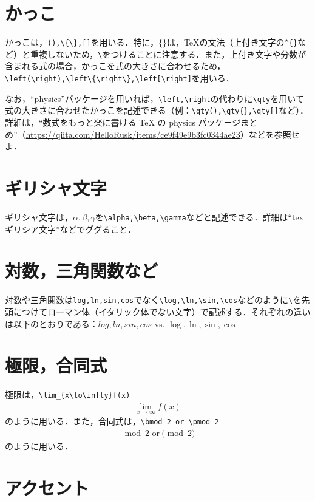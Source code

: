 \documentclass[11pt,a4paper]{jsarticle}
\begin{document}
\section{かっこ}

かっこは，\verb|(),\{\},[]|を用いる．特に，$\{\}$は，\TeX の文法（上付き文字の\verb|^{}|など）と重複しないため，\verb|\|をつけることに注意する．また，上付き文字や分数が含まれる式の場合，かっこを式の大きさに合わせるため，\verb|\left(\right),\left\{\right\},\left[\right]|を用いる．

なお，``physics''パッケージを用いれば，\verb|\left,\right|の代わりに\verb|\qty|を用いて式の大きさに合わせたかっこを記述できる（例：\verb|\qty(),\qty{},\qty[]|など）．詳細は，``数式をもっと楽に書ける TeX の physics パッケージまとめ''（\url{https://qiita.com/HelloRusk/items/ce9f49e9b3fc0344ae23}）などを参照せよ．

\section{ギリシャ文字}

ギリシャ文字は，$\alpha,\beta,\gamma$を\verb|\alpha,\beta,\gamma|などと記述できる．詳細は``tex ギリシア文字''などでググること．

\section{対数，三角関数など}

対数や三角関数は\verb|log,ln,sin,cos|でなく\verb|\log,\ln,\sin,\cos|などのように\verb|\|を先頭につけてローマン体（イタリック体でない文字）で記述する．それぞれの違いは以下のとおりである：$log,ln,sin,cos$ vs. $\log,\ln,\sin,\cos$

\section{極限，合同式}

極限は，\verb|\lim_{x\to\infty}f(x)|
\begin{align*}
  \lim_{x\to\infty}f(x)
\end{align*}
のように用いる．また，合同式は，\verb|\bmod 2 or \pmod 2|
\begin{align*}
  \bmod 2 \text{~or} \pmod 2
\end{align*}
のように用いる．

\section{アクセント}
\end{document}
